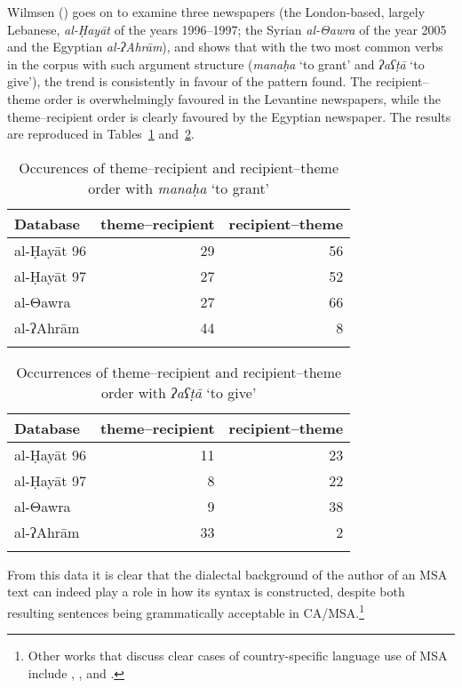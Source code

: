 \documentclass[output=paper]{langsci/langscibook}
\begin{document}
Wilmsen (\citeyear[114--115]{Wilmsen2010}) goes on to examine three newspapers (the London-based, largely Lebanese, \textit{al-Ḥayāt} of the years 1996--1997; the Syrian \textit{al-Θawra} of the year 2005 and the Egyptian \textit{al-ʔAhrām}), and shows that with the two most common verbs in the corpus with such argument structure (\textit{manaḥa} ‘to grant’ and \textit{ʔaʕṭā} ‘to give’), the trend is consistently in favour of the pattern found. The recipient–theme order is overwhelmingly favoured in the Levantine newspapers, while the theme–recipient order is clearly favoured by the Egyptian newspaper. The results are reproduced in Tables~\ref{tab:vanputten:1} and~\ref{tab:vanputten:2}.


\begin{table}
\begin{tabular}{lrr}
\lsptoprule
{Database} & {theme–recipient} & {recipient–theme}\\\midrule
al-Ḥayāt 96 & 29 & 56\\
al-Ḥayāt 97 & 27 & 52\\
al-Θawra & 27 & 66\\
al-ʔAhrām & 44 & \hphantom{1}8\\
\lspbottomrule
\end{tabular}
\caption{\label{bkm:Ref533762442}\label{tab:vanputten:1}Occurences of theme–recipient and recipient–theme order with \textit{manaḥa} ‘to grant’}
\end{table}

\begin{table}
\begin{tabular}{lrr}
\lsptoprule
{Database} & {theme–recipient} & {recipient–theme}\\\midrule
al-Ḥayāt 96 & 11 & 23\\
al-Ḥayāt 97 & \hphantom{1}8 & 22\\
al-Θawra    &  \hphantom{1}9 & 38\\
al-ʔAhrām   & 33 &  \hphantom{1}2\\
\lspbottomrule
\end{tabular}
\caption{\label{bkm:Ref533762457}\label{tab:vanputten:2}Occurrences of theme–recipient and recipient–theme order with \textit{ʔaʕṭā} ‘to give’}
\end{table}

From this data it is clear that the dialectal background of the author of an MSA text can indeed play a role in how its syntax is constructed, despite both resulting sentences being grammatically acceptable in CA/MSA.\footnote{Other works that discuss clear cases of country-specific language use of MSA include \citet{Ibrahim2009}, \citet{Parkinson2003},  \citet{Parkinson2007} and \citet{ParkinsonIbrahim1999}.}
\end{document}
